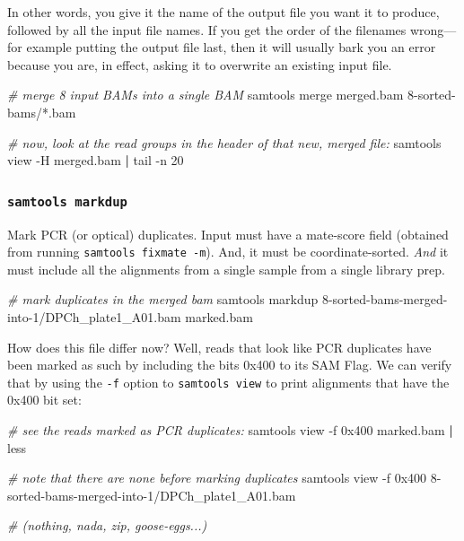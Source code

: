 \documentclass[]{krantz}
\makeatletter
\newenvironment{Shaded}{\begin{snugshade}}{\end{snugshade}}
\newcommand{\CommentTok}[1]{\textcolor[rgb]{0.37,0.37,0.37}{\textit{#1}}}
\newcommand{\ExtensionTok}[1]{#1}
\newcommand{\FunctionTok}[1]{\textcolor[rgb]{0,0,0}{#1}}
\newcommand{\KeywordTok}[1]{\textcolor[rgb]{0.27,0.27,0.27}{\textbf{#1}}}
\newcommand{\NormalTok}[1]{#1}
\newenvironment{kframe}{%
\medskip{}
\setlength{\fboxsep}{.8em}
 \def\at@end@of@kframe{}%
 \ifinner\ifhmode%
  \def\at@end@of@kframe{\end{minipage}}%
  \begin{minipage}{\columnwidth}%
 \fi\fi%
 \def\FrameCommand##1{\hskip\@totalleftmargin \hskip-\fboxsep
 \colorbox{shadecolor}{##1}\hskip-\fboxsep
     \hskip-\linewidth \hskip-\@totalleftmargin \hskip\columnwidth}%
 \MakeFramed {\advance\hsize-\width
   \@totalleftmargin\z@ \linewidth\hsize
   \@setminipage}}%
 {\par\unskip\endMakeFramed%
 \at@end@of@kframe}
\renewenvironment{Shaded}{\begin{kframe}}{\end{kframe}}
\makeatother
\begin{document}
In other words, you give it the name of the output file you want it to produce,
followed by all the input file names. If you get the order of the filenames wrong---for
example putting the output file last, then it will usually bark you an error because
you are, in effect, asking it to overwrite an existing input file.

\begin{Shaded}
\begin{Highlighting}[]
\CommentTok{# merge 8 input BAMs into a single BAM}
\ExtensionTok{samtools}\NormalTok{ merge merged.bam   8-sorted-bams/*.bam}

\CommentTok{# now, look at the read groups in the header of that new, merged file:}
\ExtensionTok{samtools}\NormalTok{ view -H merged.bam }\KeywordTok{|} \FunctionTok{tail}\NormalTok{ -n 20}
\end{Highlighting}
\end{Shaded}

\hypertarget{samtools-markdup}{%
\subsubsection{\texorpdfstring{\texttt{samtools\ markdup}}{samtools markdup}}\label{samtools-markdup}}

Mark PCR (or optical) duplicates. Input must have a mate-score field (obtained
from running \texttt{samtools\ fixmate\ -m}). And, it must be coordinate-sorted. \emph{And} it must
include all the alignments from a single sample from a single library prep.

\begin{Shaded}
\begin{Highlighting}[]
\CommentTok{# mark duplicates in the merged bam}
\ExtensionTok{samtools}\NormalTok{ markdup 8-sorted-bams-merged-into-1/DPCh_plate1_A01.bam marked.bam}
\end{Highlighting}
\end{Shaded}

How does this file differ now? Well, reads that look like PCR duplicates have
been marked as such by including the bits 0x400 to its SAM Flag. We can verify
that by using the \texttt{-f} option to \texttt{samtools\ view} to print alignments that have the
0x400 bit set:

\begin{Shaded}
\begin{Highlighting}[]
\CommentTok{# see the reads marked as PCR duplicates:}
\ExtensionTok{samtools}\NormalTok{ view -f 0x400 marked.bam }\KeywordTok{|} \FunctionTok{less}

\CommentTok{# note that there are none before marking duplicates}
\ExtensionTok{samtools}\NormalTok{ view -f 0x400 8-sorted-bams-merged-into-1/DPCh_plate1_A01.bam}

\CommentTok{# (nothing, nada, zip, goose-eggs...)}
\end{Highlighting}
\end{Shaded}
\end{document}
